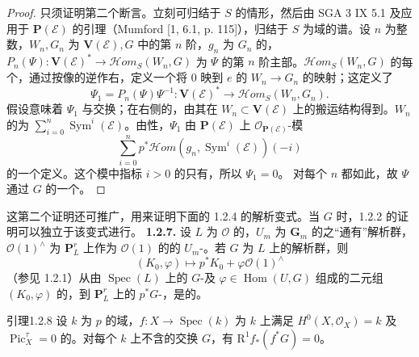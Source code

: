 \begin{proof}
只须证明第二个断言。立刻可归结于 $S$ 的情形，然后由 SGA 3 IX 5.1 及应用于 $\mathbf P(\mathscr E)$ 的引理（Mumford [1, 6.1, p. 115]），归结于 $S$ 为域的谱。设 $n$ 为整数，$W_n,G_n$ 为 $\mathbf V(\mathscr E),G$ 中的第 $n$ 阶，$g_n$ 为 $G_n$ 的，$P_n(\Psi):\mathbf V(\mathscr E)^*\to\mathscr Hom_S(W_n,G)$ 为 $\Psi$ 的第 $n$ 阶主部。$\mathscr Hom_S(W_n,G)$ 的每个，通过按像的逆作右，定义一个将 $0$ 映到 $e$ 的 $W_n\to G_n$ 的映射；这定义了
\[\Psi_1=P_n(\Psi)\Psi^{-1}:\mathbf V(\mathscr E)^*\longrightarrow\mathscr Hom_S(W_n,G_n).\]
假设意味着 $\Psi_1$ 与交换；在右侧的，由其在 $W_n\subset\mathbf V(\mathscr E)$ 上的搬运结构得到。$W_n$ 的为 $\sum_{i=0}^n\operatorname{Sym}^i(\mathscr E)$。由性，$\Psi_1$ 由 $\mathbf P(\mathscr E)$ 上 $\mathscr O_{\mathbf P(\mathscr E)}$-模
\[\sum_{i=0}^np^*\mathscr Hom(g_n,\operatorname{Sym}^i(\mathscr E))(-i)\]
的一个定义。这个模中指标 $i>0$ 的只有，所以 $\Psi_1=0$。
对每个 $n$ 都如此，故 $\Psi$ 通过 $G$ 的一个。
\end{proof}
这第二个证明还可推广，用来证明下面的 1.2.4 的解析变式。当 $G$ 时，1.2.2 的证明可以独立于该变式进行。
\textbf{1.2.7.} 设 $L$ 为 $\mathscr O$ 的，$U_m$ 为 $\mathbf G_m$ 的之“通有”解析群，$\mathscr O(1)^\wedge$ 为 $\mathbf P^r_L$ 上作为 $\mathscr O(1)$ 的的 $U_m$-。若 $G$ 为 $L$ 上的解析群，则
\[(K_0,\varphi)\longmapsto p^*K_0+\varphi\mathscr O(1)^\wedge\]
（参见 1.2.1）从由 $\operatorname{Spec}(L)$ 上的 $G$-及 $\varphi\in\operatorname{Hom}(U,G)$ 组成的二元组 $(K_0,\varphi)$ 的，到 $\mathbf P^r_L$ 上的 $p^*G$-，是的。
\begin{SGAresult}{引理}{1.2.8}
设 $k$ 为 $p$ 的域，$f:X\to\operatorname{Spec}(k)$ 为 $k$ 上满足 $H^0(X,\mathscr O_X)=k$ 及 $\operatorname{Pic}^\tau_X=0$ 的。对每个 $k$ 上不含的交换 $G$，有 $\mathrm R^1f_*(f^*G)=0$。
\end{SGAresult}
